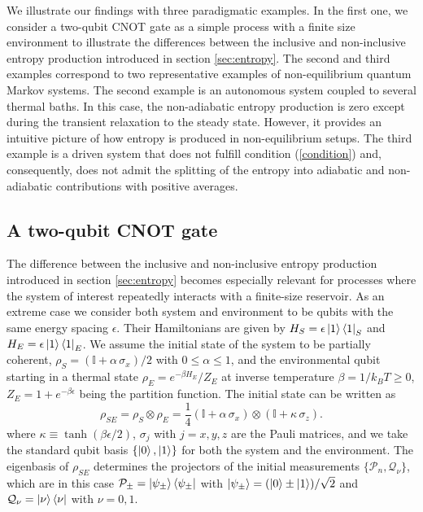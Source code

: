 \documentclass[aps,prx,twocolumn,showpacs,floatfix,superscriptaddress,graphics,longbibliography]{revtex4-1}
\begin{document}
We illustrate our findings with three paradigmatic examples. In the first one, we consider a two-qubit CNOT gate as a simple process with a finite size environment
to illustrate the differences between the inclusive and non-inclusive entropy production introduced in  section \ref{sec:entropy}. 
The second and third examples correspond to two representative examples of non-equilibrium quantum Markov systems.
The second example is an autonomous system coupled to several thermal baths. In this case, the non-adiabatic entropy production is zero except during the transient relaxation to the steady state. 
However, it provides an intuitive picture of how entropy is produced in non-equilibrium setups. The third example is a driven system that does not fulfill condition (\ref{condition}) and, 
consequently, does not admit the splitting of the entropy into adiabatic and non-adiabatic contributions with positive averages. 

\subsection{A two-qubit CNOT gate}
\label{sec:cnot}

The difference between the inclusive and non-inclusive entropy production introduced in section \ref{sec:entropy} becomes especially relevant for processes where the system of interest repeatedly interacts with a finite-size reservoir.
As an extreme case we consider both system and environment to be qubits with the same energy spacing $\epsilon$. 
Their Hamiltonians are given by $H_S = \epsilon \ket{1}\bra{1}_S$ and $H_E = \epsilon \ket{1}\bra{1}_E$. We assume the initial state of the system to be partially coherent, $\rho_S = (\mathbb{I}+\alpha\,\sigma_x)/2$ with $0 \leq \alpha \leq 1$, 
and the environmental qubit starting in a thermal state $\rho_E = e^{- \beta H_E}/Z_E$ at inverse temperature $\beta = 1/k_B T \geq 0$,  $Z_E=1+e^{-\beta\epsilon}$ being the partition function. The initial state can be written as
\begin{equation}
\rho_{SE}=\rho_S \otimes \rho_E =\frac{1}{4}\left(\mathbb{I}+\alpha\,\sigma_x\right)\otimes \left(\mathbb{I}+\kappa\,\sigma_z\right).
\end{equation}
where $\kappa \equiv \tanh(\beta \epsilon/2)$, $\sigma_j$ with $j=x,y,z$ are the Pauli matrices, and we take the standard qubit basis  $\{\ket{0},\ket{1}\}$ for both the system and the environment. The eigenbasis of $\rho_{SE}$ determines the projectors of the initial measurements $\{ \mathcal{P}_n, \mathcal{Q}_\nu\}$, which are in this case  $\mathcal{P}_\pm = \ket{\psi_\pm}\bra{\psi_\pm}$ with $\ket{\psi_\pm}=(\ket{0}\pm \ket{1})/\sqrt{2}$ and $\mathcal{Q}_\nu = \ket{\nu}\bra{\nu}$ with $\nu=0,1$.
\end{document}
